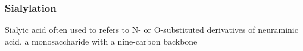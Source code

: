 \subsubsection {Sialylation}
Sialyic acid often used to refers to N- or O-substituted derivatives of neuraminic acid, a monosaccharide with a nine-carbon backbone